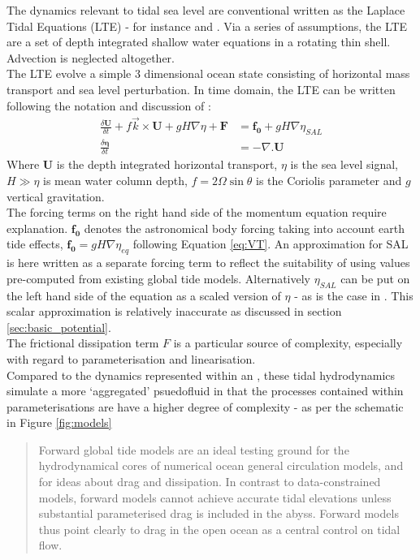 The dynamics relevant to tidal sea level are conventional written as the Laplace Tidal Equations (LTE) - for instance \cite[9.8]{gill1982atmosphere} and \cite{Hendershott:1981ub}.   
Via a series of assumptions, the LTE are a set of depth integrated shallow water equations in a rotating thin shell.  Advection is neglected altogether.\\
The LTE evolve a simple 3 dimensional ocean state consisting of horizontal mass transport and sea level perturbation. In time domain, the LTE can be written following the notation and discussion of \cite[pp185]{Egbert:2002ug}:
\begin{align}
    \label{E:LTE_momtm}
    \frac{\delta \mathbf{U} }{ \delta t} + f\vec{k} \times \mathbf{U} + gH\nabla \eta  + \mathbf{F} &= \mathbf{f_0} + gH \nabla \eta_{SAL} \\
    \label{E:LTE_cont}
    \frac{\delta \mathbf{\eta} }{\delta t} &= -\nabla.\mathbf{U} 
\end{align}
Where $\mathbf{U}$ is the depth integrated horizontal transport, $\eta$ is the sea level signal, $H \gg \eta$ is mean water column depth, $f=2\Omega\sin\theta$ is the Coriolis parameter and $g$ vertical gravitation.\\
The forcing terms on the right hand side of the momentum equation \label{E:LTE_momtm} require explanation.  
$\mathbf{f_0}$ denotes the astronomical body forcing taking into account earth tide effects, $\mathbf{f_0} = gH\nabla\eta_{eq}$ following Equation \ref{eq:VT}.  
An approximation for SAL is here written as a separate forcing term to reflect the suitability of using values pre-computed from existing global tide models.   
Alternatively $\eta_{SAL}$ can be put on the left hand side of the equation as a scaled version of $\eta$ - as is the case in \MOM{}.   
This scalar approximation is relatively inaccurate as discussed in section \ref{sec:basic_potential}.\\
The frictional dissipation term $F$ is a particular source of complexity, especially with regard to parameterisation and linearisation.\\

Compared to the dynamics represented within an \OGCM{}, these tidal hydrodynamics simulate a more `aggregated' psuedofluid in that the processes contained within parameterisations are have a higher degree of complexity - as per the schematic in Figure \ref{fig:models} \\
\begin{quotation}
Forward global tide models are an ideal testing ground for the hydrodynamical cores of numerical ocean general circulation models, and for ideas about drag and dissipation. In contrast to data-constrained models, forward models cannot achieve accurate tidal elevations unless substantial parameterised drag is included in the abyss. Forward models thus point clearly to drag in the open ocean as a central control on tidal flow.\citep{Arbic:2004wz}
\end{quotation} 


